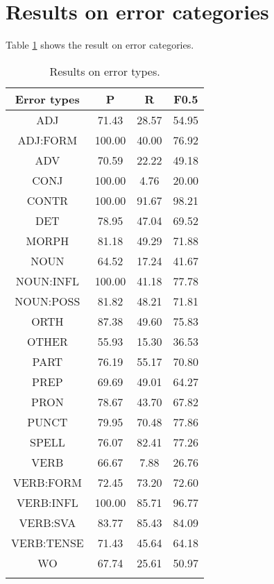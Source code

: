 \documentclass[11pt,a4paper]{article}
\begin{document}
\section{Results on error categories}
Table \ref{tbl:error_categories} shows the result on error categories.
\begin{table}
    \centering
    \begin{tabular}{cccc}
        \Xhline{1.1pt}
        \textbf{Error types}  & \textbf{P} & \textbf{R} & \textbf{F0.5} \\
        \hline
         ADJ & 71.43 & 28.57 & 54.95 \\
         ADJ:FORM & 100.00 & 40.00 & 76.92 \\
         ADV & 70.59 &	22.22 &	49.18 \\
         CONJ & 100.00 &	4.76 &	20.00 \\
         CONTR & 100.00 &	91.67 &	98.21 \\
         DET & 78.95 &	47.04 &	69.52 \\
         MORPH & 81.18 &	49.29 &	71.88 \\
         NOUN & 64.52 &	17.24 &	41.67 \\
         NOUN:INFL & 100.00 &	41.18 &	77.78 \\
         NOUN:POSS & 81.82 &	48.21 &	71.81 \\
         ORTH & 87.38 &	49.60 &	75.83 \\
         OTHER & 55.93 &	15.30 &	36.53 \\
         PART & 76.19 &	55.17 &	70.80 \\
         PREP & 69.69 &	49.01 &	64.27 \\
         PRON & 78.67 &	43.70 &	67.82 \\
         PUNCT & 79.95 &	70.48 &	77.86 \\
         SPELL & 76.07 &	82.41 &	77.26 \\
         VERB & 66.67 &	7.88 &	26.76 \\
         VERB:FORM & 72.45 &	73.20 &	72.60 \\
         VERB:INFL & 100.00 &	85.71 &	96.77 \\
         VERB:SVA & 83.77 &	85.43 &	84.09 \\
         VERB:TENSE & 71.43 &	45.64 &	64.18 \\
         WO & 67.74 &	25.61 &	50.97 \\
         \Xhline{1.1pt}
    \end{tabular}
    \caption{Results on error types. }
    \label{tbl:error_categories}
\end{table}
\end{document}
